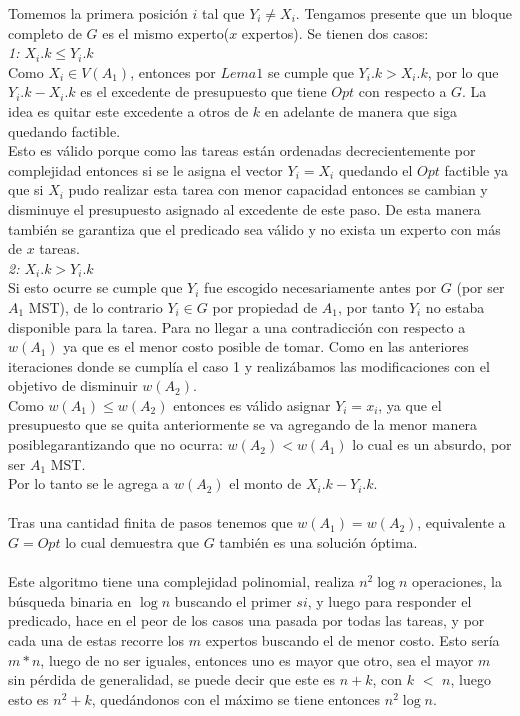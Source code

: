 \documentclass[10pt,letterpaper]{article}
\begin{document}
{ 	 Tomemos la primera posici\'on $i$ tal que $Y_{i} \neq X_{i}$. Tengamos presente que un bloque completo de $G$ es el mismo experto($x$ expertos). Se tienen dos casos: \\
 	 \textit{1: $X_{i}.k \leq Y_{i}.k$} \\
 	 Como $X_{i} \in V(A_{1})$, entonces por $Lema 1$ se cumple que $Y_{i}.k > X_{i}.k$, por lo que $Y_{i}.k - X_{i}.k$ es el excedente de presupuesto que tiene $Opt$ con respecto a $G$. La idea es quitar este excedente a otros de $k$ en adelante de manera que siga quedando factible.\\
 	 Esto es v\'alido porque como las tareas est\'an ordenadas decrecientemente por complejidad entonces si se le asigna el vector $Y_{i} = X_{i}$ quedando el $Opt$ factible ya que si $X_{i}$ pudo realizar esta tarea con menor capacidad entonces se cambian y disminuye el presupuesto asignado al excedente de este paso. De esta manera tambi\'en se garantiza que el predicado sea v\'alido y no exista un experto con m\'as de $x$ tareas. \\
 	 \textit{2: $X_{i}.k > Y_{i}.k$} \\
 	 Si esto ocurre se cumple que $Y_{i}$ fue escogido necesariamente antes por $G$ (por ser $A_{1}$ MST), de lo contrario $Y_{i} \in G$ por propiedad de $A_{1}$, por tanto $Y_{i}$ no estaba disponible para la tarea. Para no llegar a una contradicci\'on con respecto a $w(A_{1})$ ya que es el menor costo posible de tomar. Como en las anteriores iteraciones donde se cumpl\'ia el caso 1 y realiz\'abamos las modificaciones con el objetivo de disminuir $w(A_{2})$. \\
 	 Como $w(A_{1}) \leq w(A_{2})$ entonces es v\'alido asignar $Y_{i} = x_{i}$, ya que el presupuesto que se quita anteriormente se va agregando de la menor manera posiblegarantizando que no ocurra: $w(A_{2}) < w(A_{1})$ lo cual es un absurdo, por ser $A_{1}$ MST. \\
 	 Por  lo tanto se le agrega a $w(A_{2})$ el monto de $X_{i}.k - Y_{i}.k$. \\ \\
 	 Tras una cantidad finita de pasos tenemos que $w(A_{1}) = w(A_{2})$, equivalente a $G = Opt$ lo cual demuestra que $G$ tambi\'en es una soluci\'on \'optima. \\ \\
 	
 	
 	Este algoritmo tiene una complejidad polinomial, realiza $n^{2} \log{n}$ operaciones, la b\'usqueda binaria en $\log{n}$ buscando el primer $si$, y luego para responder el predicado, hace en el peor de los casos una pasada por todas las tareas, y por cada una de estas recorre los $m$ expertos buscando el de menor costo. Esto ser\'ia $m*n$, luego de no ser iguales, entonces uno es mayor que otro, sea el mayor $m$ sin p\'erdida de generalidad, se puede decir que este es $n+k$, con $k$ $<$ $n$, luego esto es $n^{2}+k$, qued\'andonos con el m\'aximo se tiene entonces $n^{2} \log{n}$.  
 	
 	

}
 	
 
\end{document}
